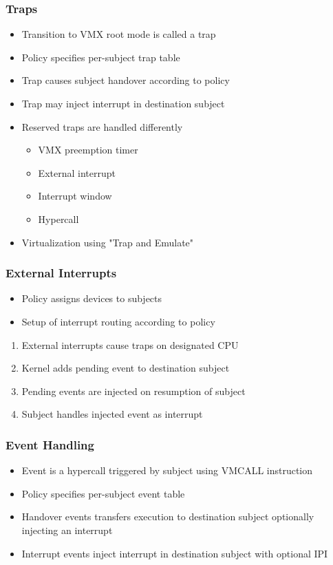\documentclass[xcolor={dvipsnames}]{beamer}
\begin{document}
\begin{frame}\frametitle{Traps}
\begin{itemize}
	\item Transition to VMX root mode is called a trap
	\item Policy specifies per-subject trap table
	\item Trap causes subject handover according to policy
	\item Trap may inject interrupt in destination subject
	\item Reserved traps are handled differently
		\begin{itemize}
			\item VMX preemption timer
			\item External interrupt
			\item Interrupt window
			\item Hypercall
		\end{itemize}
	\item Virtualization using "Trap and Emulate"
\end{itemize}

\end{frame}

\begin{frame}\frametitle{External Interrupts}
\begin{itemize}
	\item Policy assigns devices to subjects
	\item Setup of interrupt routing according to policy
\end{itemize}
\begin{center}
	\noindent\resizebox{.55\textwidth}{!}{}
\end{center}
\begin{enumerate}
	\item External interrupts cause traps on designated CPU
	\item Kernel adds pending event to destination subject
	\item Pending events are injected on resumption of subject
	\item Subject handles injected event as interrupt
\end{enumerate}
\end{frame}

\begin{frame}\frametitle{Event Handling}
\begin{itemize}
	\item Event is a hypercall triggered by subject using VMCALL instruction
	\item Policy specifies per-subject event table
	\item Handover events transfers execution to destination subject optionally injecting an interrupt
	\item Interrupt events inject interrupt in destination subject with optional IPI
\end{itemize}

\end{frame}
\end{document}
